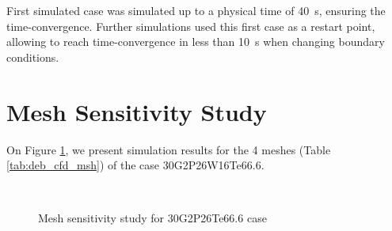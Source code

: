 \begin{note*}{}
First simulated case was simulated up to a physical time of 40\ s, ensuring the time-convergence. Further simulations used this first case as a restart point, allowing to reach time-convergence in less than 10\ s when changing boundary conditions.  
\end{note*}



\section{Mesh Sensitivity Study}

On Figure \ref{fig:deb_cfd_msh_sensi}, we present simulation results for the 4 meshes (Table \ref{tab:deb_cfd_msh}) of the case 30G2P26W16Te66.6. 


\begin{figure}[!h]
\centering
{}
\\
\caption{Mesh sensitivity study for 30G2P26Te66.6 case}
\label{fig:deb_cfd_msh_sensi}
\end{figure}


